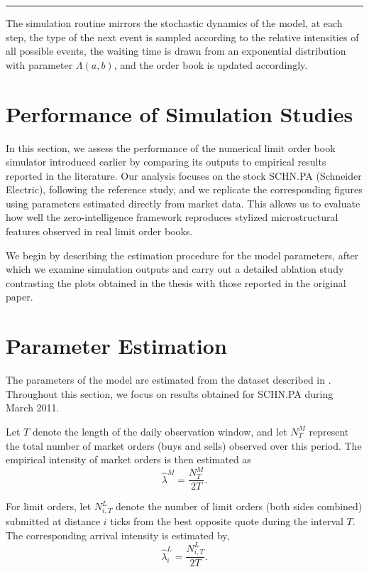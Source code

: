 \noindent\rule{\textwidth}{0.4pt}



The simulation routine mirrors the stochastic dynamics of the model, at each step, the
type of the next event is sampled according to the relative intensities of all possible
events, the waiting time is drawn from an exponential distribution with parameter
$\Lambda(a,b)$, and the order book is updated accordingly. 

\section*{Performance of Simulation Studies}

In this section, we assess the performance of the numerical limit order book simulator
introduced earlier by comparing its outputs to empirical results reported in the literature.
Our analysis focuses on the stock SCHN.PA (Schneider Electric), following the reference
study, and we replicate the corresponding figures using parameters estimated directly from
market data. This allows us to evaluate how well the zero-intelligence framework 
reproduces stylized microstructural features observed in real limit order books.

We begin by describing the estimation procedure for the model parameters, after which we
examine simulation outputs and carry out a detailed ablation study contrasting the plots
obtained in the thesis with those reported in the original paper.

\section{Parameter Estimation}

The parameters of the model are estimated from the dataset described in \cite{Abergel2016}.
Throughout this section, we focus on results obtained for SCHN.PA during March 2011.

Let $T$ denote the length of the daily observation window, and let $N^{M}_{T}$ represent
the total number of market orders (buys and sells) observed over this period. The empirical
intensity of market orders is then estimated as
\begin{equation}
    \widehat{\lambda}^{M}
    = \frac{N^{M}_{T}}{2T}.
\end{equation}

For limit orders, let $N^{L}_{i,T}$ denote the number of limit orders (both sides combined)
submitted at distance $i$ ticks from the best opposite quote during the interval $T$. The
corresponding arrival intensity is estimated by,
\begin{equation}
    \widehat{\lambda}^{L}_{i}
    = \frac{N^{L}_{i,T}}{2T}.
\end{equation}


